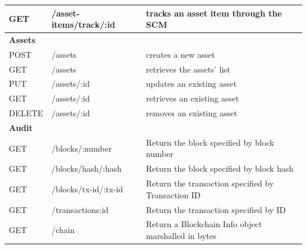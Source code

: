 \begin{table}[htb]
\begin{center}
\begin{tabular}{|l|p{4.5cm}|p{7.664cm}|}
        \hline 
        GET & /asset-items/track/:id & tracks an asset item through the SCM\\
        \hline
        \cellcolor{cyan}\textbf{Assets}  & \cellcolor{cyan}\textbf{} & \cellcolor{cyan}\textbf{} \\
        \hline 
        POST & /assets & creates a new asset\\
        \hline 
        GET & /assets & retrieves the assets' list\\
        \hline 
        PUT & /assets/:id & updates an existing asset\\
        \hline 
        GET & /assets/:id & retrieves an existing asset\\
        \hline 
        DELETE & /assets/:id & removes an existing asset\\
        \hline 
        \cellcolor{cyan}\textbf{Audit}  & \cellcolor{cyan}\textbf{} & \cellcolor{cyan}\textbf{} \\
        \hline
         GET & /blocks/:number & Return the block specified by block number\\
        \hline 
         GET & /blocks/hash/:hash & Return the block specified by block hash\\
        \hline 
         GET & /blocks/tx-id/:tx-id & Return the transaction specified by Transaction ID\\
        \hline 
         GET & /transactions:id & Return the transaction specified by ID\\
        \hline 
         GET & /chain & Return a Blockchain Info object marshalled in bytes\\
        \hline 
    \end{tabular}
    \end{center}
\end{table}